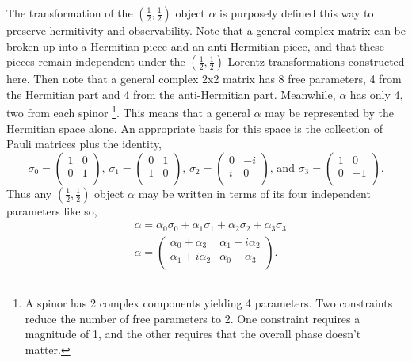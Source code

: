 \documentclass[12pt]{article}
\begin{document}
The transformation of the $(\frac{1}{2}, \frac{1}{2})$ object $\alpha$ is purposely defined this way to preserve hermitivity and observability. Note that a general complex matrix can be broken up into a Hermitian piece and an anti-Hermitian piece, and that these pieces remain independent under the $(\frac{1}{2}, \frac{1}{2})$ Lorentz transformations constructed here. Then note that a general complex 2x2 matrix has 8 free parameters, 4 from the Hermitian part and 4 from the anti-Hermitian part. Meanwhile, $\alpha$ has only 4, two from each spinor \footnote{A spinor has 2 complex components yielding 4 parameters. Two constraints reduce the number of free parameters to 2. One constraint requires a magnitude of 1, and the other requires that the overall phase doesn't matter.}. This means that a general $\alpha$ may be represented by the Hermitian space alone. An appropriate basis for this space is the collection of Pauli matrices plus the identity,
\begin{equation}
\sigma_0 =  
\begin{pmatrix}
1 & 0 \\
0 & 1 \\
\end{pmatrix}\text{, }
\sigma_1 =  
\begin{pmatrix}
0 & 1 \\
1 & 0 \\
\end{pmatrix}\text{, }
\sigma_2 = 
\begin{pmatrix}
0 & -i \\
i & 0 \\
\end{pmatrix}\text{, and }
\sigma_3 = 
\begin{pmatrix}
1 & 0 \\
0 & -1 \\
\end{pmatrix}.
\end{equation}
Thus any $(\frac{1}{2}, \frac{1}{2})$ object $\alpha$ may be written in terms of its four independent parameters like so, 
\begin{equation}
\begin{split}
&\alpha = \alpha_0 \sigma_0 + \alpha_1 \sigma_1 + \alpha_2 \sigma_2 + \alpha_3 \sigma_3 \\
&\alpha = 
\begin{pmatrix}
\alpha_0 + \alpha_3 & \alpha_1 - i\alpha_2 \\
\alpha_1 + i\alpha_2 & \alpha_0 - \alpha_3 \\
\end{pmatrix}.
\end{split}
\end{equation}
\end{document}
